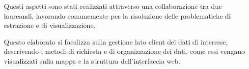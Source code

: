 Questi aspetti sono stati realizzati attraverso una collaborazione tra due laureandi, lavorando comunemente per la risoluzione delle problematiche di estrazione e di visualizzazione.

Questo elaborato si focalizza sulla gestione lato client dei dati di interesse, descrivendo i metodi di richiesta e di organizzazione dei dati, come essi vengano visualizzati sulla mappa e la struttura dell'interfaccia web.


\newpage
